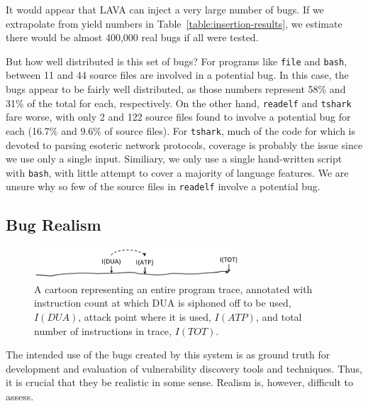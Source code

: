It would appear that LAVA can inject a very large number of bugs.
If we extrapolate from yield numbers in Table~\ref{table:insertion-results}, we estimate there would be almost 400,000 real bugs if all were tested.

\noindent
But how well distributed is this set of bugs? 
For programs like \verb+file+ and \verb+bash+, between 11 and 44 source files  are involved in a potential bug.
In this case, the bugs appear to be fairly well distributed, as those numbers represent 58\% and 31\% of the total for each, respectively.
On the other hand, \verb+readelf+ and \verb+tshark+ fare worse, with only 2 and 122 source files found to involve a potential bug for each (16.7\% and 9.6\% of source files).
For \verb+tshark+, much of the code for which is devoted to parsing esoteric network protocols, coverage is probably the issue since we use only a single input.
Similiary, we only use a single hand-written script with \verb+bash+, with little attempt to cover a majority of language features.
We are unsure why so few of the source files in \verb+readelf+ involve a potential bug.
 

\subsection{Bug Realism}


\begin{figure}
\centering
\includegraphics[width=3in]{trace-dua-atp.png}
\caption{A cartoon representing an entire program trace, annotated with instruction count at which DUA is siphoned off to be used, $I(DUA)$, attack point where it is used, $I(ATP)$, and total number of instructions in trace, $I(TOT)$.}
\label{fig:dua-atp-trace}
\end{figure}

The intended use of the bugs created by this system is as ground truth for development and evaluation of vulnerability discovery tools and techniques. 
Thus, it is crucial that they be realistic in some sense.  
Realism is, however, difficult to assess.

